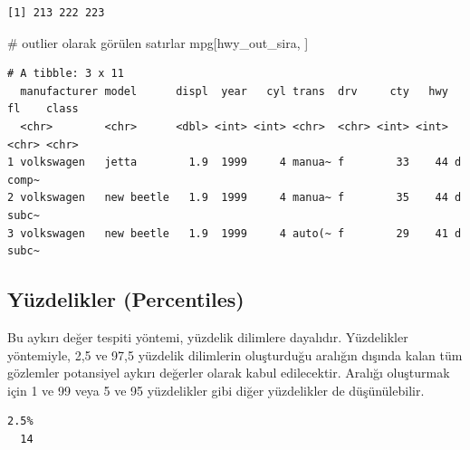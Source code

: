 \documentclass[
  letterpaper,
  DIV=11,
  numbers=noendperiod]{scrreprt}
\newenvironment{Shaded}{\begin{snugshade}}{\end{snugshade}}
\newcommand{\CommentTok}[1]{\textcolor[rgb]{0.37,0.37,0.37}{#1}}
\newcommand{\FloatTok}[1]{\textcolor[rgb]{0.68,0.00,0.00}{#1}}
\newcommand{\FunctionTok}[1]{\textcolor[rgb]{0.28,0.35,0.67}{#1}}
\newcommand{\NormalTok}[1]{\textcolor[rgb]{0.00,0.23,0.31}{#1}}
\newcommand{\OtherTok}[1]{\textcolor[rgb]{0.00,0.23,0.31}{#1}}
\newcommand{\SpecialCharTok}[1]{\textcolor[rgb]{0.37,0.37,0.37}{#1}}
\begin{document}
\begin{verbatim}
[1] 213 222 223
\end{verbatim}

\begin{Shaded}
\begin{Highlighting}[]
\CommentTok{\# outlier olarak görülen satırlar}
\NormalTok{mpg[hwy\_out\_sira, ]}
\end{Highlighting}
\end{Shaded}

\begin{verbatim}
# A tibble: 3 x 11
  manufacturer model      displ  year   cyl trans  drv     cty   hwy fl    class
  <chr>        <chr>      <dbl> <int> <int> <chr>  <chr> <int> <int> <chr> <chr>
1 volkswagen   jetta        1.9  1999     4 manua~ f        33    44 d     comp~
2 volkswagen   new beetle   1.9  1999     4 manua~ f        35    44 d     subc~
3 volkswagen   new beetle   1.9  1999     4 auto(~ f        29    41 d     subc~
\end{verbatim}

\hypertarget{yuxfczdelikler-percentiles}{%
\subsection*{Yüzdelikler
(Percentiles)}\label{yuxfczdelikler-percentiles}}

Bu aykırı değer tespiti yöntemi, yüzdelik dilimlere dayalıdır.
Yüzdelikler yöntemiyle, 2,5 ve 97,5 yüzdelik dilimlerin oluşturduğu
aralığın dışında kalan tüm gözlemler potansiyel aykırı değerler olarak
kabul edilecektir. Aralığı oluşturmak için 1 ve 99 veya 5 ve 95
yüzdelikler gibi diğer yüzdelikler de düşünülebilir.

\begin{Shaded}
\end{Shaded}

\begin{verbatim}
2.5% 
  14 
\end{verbatim}

\begin{Shaded}
\end{Shaded}
\end{document}
